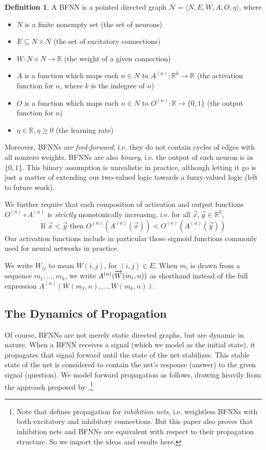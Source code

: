 \documentclass[letterpaper]{article}
\theoremstyle{definition}
\newtheorem{definition}{Definition}
\newcommand{\set}[1]{\{ #1 \}}
\newcommand{\Net}{\mathcal{N}}
\begin{document}
\begin{definition} A BFNN is a pointed directed graph ${\Net = \langle N, E, W, A, O, \eta \rangle}$, where
\begin{itemize}
    \item $N$ is a finite nonempty set (the set of neurons)
    \item $E \subseteq N \times N$ (the set of excitatory connections)
    \item $W : N \times N \to \mathbb{R}$ (the weight of a given connection)
    \item $A$ is a function which maps each $n \in N$ to
    $A^{(n)} : \mathbb{R}^k \to \mathbb{R}$ (the activation function for $n$, where $k$ is the indegree of $n$)
    \item $O$ is a function which maps each $n \in N$ to 
    $O^{(n)} : \mathbb{R} \to \set{0, 1}$ (the output function for $n$)
    \item $\eta \in \mathbb{R}, \eta \geq 0$ (the learning rate)
\end{itemize}
Moreover, BFNNs are \emph{feed-forward}, i.e. they do not contain cycles of edges with all nonzero weights.  BFNNs are also \emph{binary}, i.e. the output of each neuron is in $\set{0, 1}$.  This binary assumption is unrealistic in practice, although letting it go is just a matter of extending our two-valued logic towards a fuzzy-valued logic (left to future work).

We further require that each composition of activation and output functions ${O^{(n)} \circ A^{(n)}}$ is \textit{strictly} monotonically increasing, i.e. for all $\vec{x}, \vec{y} \in \mathbb{R}^k$,
\[
\mbox{If } \vec{x} < \vec{y} \mbox{ then } O^{(n)}(A^{(n)}(\vec{x})) < O^{(n)}(A^{(n)}(\vec{y}))
\]
Our activation functions include in particular those sigmoid functions commonly used for neural networks in practice.
\end{definition}

We write $W_{ij}$ to mean $W(i,j)$, for ${(i, j) \in E}$.  When $m_i$ is drawn from a sequence ${m_1, \ldots, m_k}$, we write ${A^{(n)}(\smash{\overrightarrow{W}}(m_i, n))}$ as shorthand instead of the full expression $A^{(n)}(W(m_1, n), \ldots, W(m_k, n))$.


\subsection{The Dynamics of Propagation}

Of course, BFNNs are not merely static directed graphs, but are dynamic in nature.  When a BFNN receives a signal (which we model as the initial state), it propagates that signal forward until the state of the net stabilizes.  This stable state of the net is considered to contain the net's response (answer) to the given signal (question).  We model forward propagation as follows, drawing heavily from the approach proposed by \cite{leitgeb2001nonmonotonic}.\footnote{Note that \cite{leitgeb2001nonmonotonic} defines propagation for \emph{inhibition nets}, i.e. weightless BFNNs with both excitatory and inhibitory connections.  But this paper also proves that inhibition nets and BFNNs are equivalent with respect to their propagation structure.   So we import the ideas and results here.}  
\end{document}
